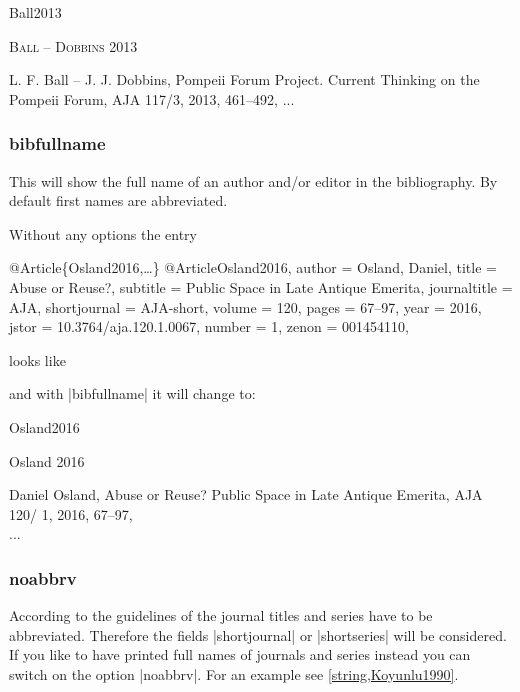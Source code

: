 \documentclass[a4paper,
10pt,
greek,
french,
spanish,
italian,
ngerman,
english
]{ltxdoc}
\begin{document}
\begin{bibbox}{Ball2013}\footnotesize
\parbox[t]{3cm}{{\scshape \color{red}Ball – Dobbins} 2013}\parbox[t]{8.5cm}{%
L. F. Ball – J. J. Dobbins, Pompeii Forum Project. Current Thinking on the Pompeii Forum, AJA 117/3, 2013, 461–492,\newline
...}
\end{bibbox}

\subsubsection{bibfullname}\label{bibfullname}
This will show the full name of an author and/or editor in the bibliography. 
By default first names are abbreviated.

Without any options the entry

\begin{bibexample}[label=Osland2016]{{@}Article\{Osland2016,…\}}
@Article{Osland2016,
  author       = {Osland, Daniel},
  title        = {Abuse or Reuse?},
  subtitle     = {Public Space in Late Antique Emerita},
  journaltitle = AJA,
  shortjournal = AJA-short,
  volume       = {120},
  pages        = {67--97},
  year         = {2016},
  jstor        = {10.3764/aja.120.1.0067},
  number       = {1},
  zenon        = {001454110},
}
\end{bibexample}

looks like


and with |bibfullname| it will change to:

\begin{bibbox}{Osland2016}\footnotesize
\parbox[t]{2cm}{Osland 2016} \parbox[t]{9cm}{{\color{red}Daniel} Osland, Abuse or Reuse? Public Space in Late Antique Emerita, AJA 120/ 1, 2016, 67–97,\\
...}
\end{bibbox}

\subsubsection{noabbrv}\label{noabbrevs}
According to the guidelines of the \DAI journal titles and series have to be abbreviated.
Therefore the fields |shortjournal| or |shortseries| will be considered. 
If you like to have printed full names of journals and series instead you can switch on the option |noabbrv|.
For an example see \cref{string,Koyunlu1990}.
\end{document}
